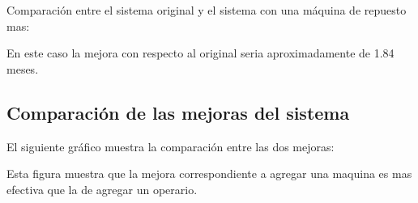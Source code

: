 \documentclass[12pt]{article}
\begin{document}
Comparación entre el sistema original y el sistema con una máquina de repuesto mas: 

\begin{figure}[hbt]
\noindent{}
\end{figure}

En este caso la mejora con respecto al original seria aproximadamente de 1.84 meses.

\pagebreak

\subsection{Comparación de las mejoras del sistema}

El siguiente gráfico muestra la comparación entre las dos mejoras:

\begin{figure}[hbt]
\noindent{}
\end{figure}

Esta figura muestra que la mejora correspondiente a agregar una maquina es mas efectiva que la de agregar un operario.
\end{document}
